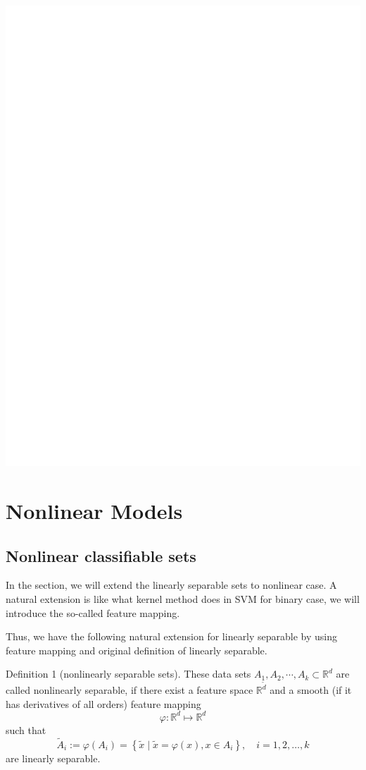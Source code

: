 \documentclass[10pt]{article}
\begin{document}
\includegraphics[max width=\textwidth]{2022_01_05_20c4aca6821d56656c19g-4}

\section{Nonlinear Models}
\subsection{Nonlinear classifiable sets}
In the section, we will extend the linearly separable sets to nonlinear case. A natural extension is like what kernel method does in SVM for binary case, we will introduce the so-called feature mapping.

Thus, we have the following natural extension for linearly separable by using feature mapping and original definition of linearly separable.

Definition 1 (nonlinearly separable sets). These data sets $A_{1}, A_{2}, \cdots, A_{k} \subset \mathbb{R}^{d}$ are called nonlinearly separable, if there exist a feature space $\mathbb{R}^{\tilde{d}}$ and a smooth (if it has derivatives of all orders) feature mapping
$$
\varphi: \mathbb{R}^{d} \mapsto \mathbb{R}^{d}
$$
such that
$$
\tilde{A}_{i}:=\varphi\left(A_{i}\right)=\left\{\tilde{x} \mid \tilde{x}=\varphi(x), x \in A_{i}\right\}, \quad i=1,2, \ldots, k
$$
are linearly separable.
\end{document}
